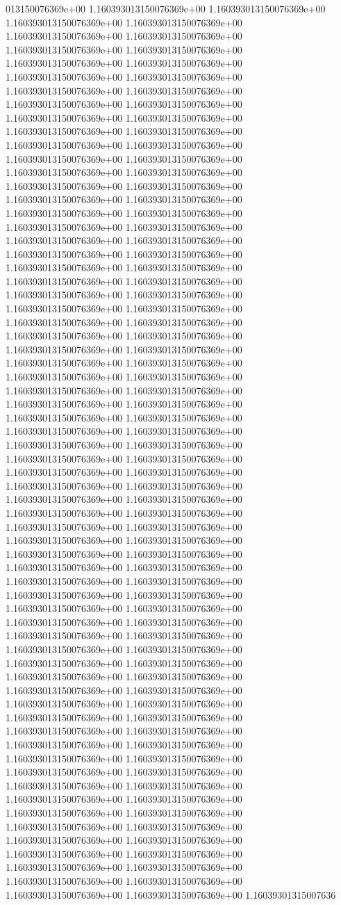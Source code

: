 013150076369e+00	1.160393013150076369e+00	1.160393013150076369e+00	1.160393013150076369e+00	1.160393013150076369e+00	1.160393013150076369e+00	1.160393013150076369e+00	1.160393013150076369e+00	1.160393013150076369e+00	1.160393013150076369e+00	1.160393013150076369e+00	1.160393013150076369e+00	1.160393013150076369e+00	1.160393013150076369e+00	1.160393013150076369e+00	1.160393013150076369e+00	1.160393013150076369e+00	1.160393013150076369e+00	1.160393013150076369e+00	1.160393013150076369e+00	1.160393013150076369e+00	1.160393013150076369e+00	1.160393013150076369e+00	1.160393013150076369e+00	1.160393013150076369e+00	1.160393013150076369e+00	1.160393013150076369e+00	1.160393013150076369e+00	1.160393013150076369e+00	1.160393013150076369e+00	1.160393013150076369e+00	1.160393013150076369e+00	1.160393013150076369e+00	1.160393013150076369e+00	1.160393013150076369e+00	1.160393013150076369e+00	1.160393013150076369e+00	1.160393013150076369e+00	1.160393013150076369e+00	1.160393013150076369e+00	1.160393013150076369e+00	1.160393013150076369e+00	1.160393013150076369e+00	1.160393013150076369e+00	1.160393013150076369e+00	1.160393013150076369e+00	1.160393013150076369e+00	1.160393013150076369e+00	1.160393013150076369e+00	1.160393013150076369e+00	1.160393013150076369e+00	1.160393013150076369e+00	1.160393013150076369e+00	1.160393013150076369e+00	1.160393013150076369e+00	1.160393013150076369e+00	1.160393013150076369e+00	1.160393013150076369e+00	1.160393013150076369e+00	1.160393013150076369e+00	1.160393013150076369e+00	1.160393013150076369e+00	1.160393013150076369e+00	1.160393013150076369e+00	1.160393013150076369e+00	1.160393013150076369e+00	1.160393013150076369e+00	1.160393013150076369e+00	1.160393013150076369e+00	1.160393013150076369e+00	1.160393013150076369e+00	1.160393013150076369e+00	1.160393013150076369e+00	1.160393013150076369e+00	1.160393013150076369e+00	1.160393013150076369e+00	1.160393013150076369e+00	1.160393013150076369e+00	1.160393013150076369e+00	1.160393013150076369e+00	1.160393013150076369e+00	1.160393013150076369e+00	1.160393013150076369e+00	1.160393013150076369e+00	1.160393013150076369e+00	1.160393013150076369e+00	1.160393013150076369e+00	1.160393013150076369e+00	1.160393013150076369e+00	1.160393013150076369e+00	1.160393013150076369e+00	1.160393013150076369e+00	1.160393013150076369e+00	1.160393013150076369e+00	1.160393013150076369e+00	1.160393013150076369e+00	1.160393013150076369e+00	1.160393013150076369e+00	1.160393013150076369e+00	1.160393013150076369e+00	1.160393013150076369e+00	1.160393013150076369e+00	1.160393013150076369e+00	1.160393013150076369e+00	1.160393013150076369e+00	1.160393013150076369e+00	1.160393013150076369e+00	1.160393013150076369e+00	1.160393013150076369e+00	1.160393013150076369e+00	1.160393013150076369e+00	1.160393013150076369e+00	1.160393013150076369e+00	1.160393013150076369e+00	1.160393013150076369e+00	1.160393013150076369e+00	1.160393013150076369e+00	1.160393013150076369e+00	1.160393013150076369e+00	1.160393013150076369e+00	1.160393013150076369e+00	1.160393013150076369e+00	1.160393013150076369e+00	1.160393013150076369e+00	1.160393013150076369e+00	1.160393013150076369e+00	1.160393013150076369e+00	1.160393013150076369e+00	1.160393013150076369e+00	1.160393013150076369e+00	1.160393013150076369e+00	1.160393013150076369e+00	1.160393013150076369e+00	1.16039301315007636